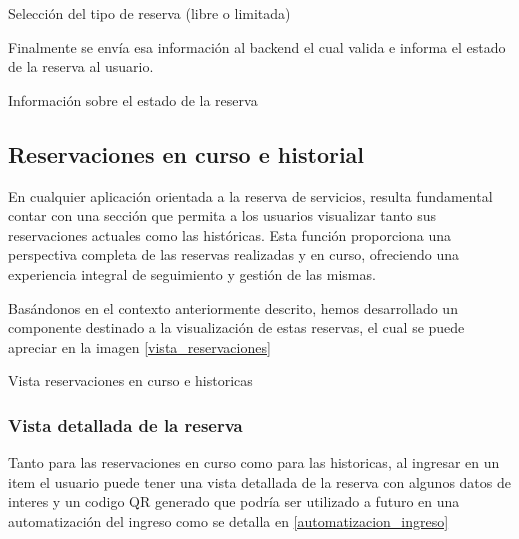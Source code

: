 \begin{images}[\label{reserva_process}]{Selección del tipo de reserva (libre o limitada)}
\end{images}

Finalmente se envía esa información al backend el cual valida e informa el estado de la reserva al usuario.

\begin{images}[\label{reservacion_checkout}]{Información sobre el estado de la reserva}
\end{images}


\subsection{Reservaciones en curso e historial}
En cualquier aplicación orientada a la reserva de servicios, resulta fundamental contar con una sección que permita a los usuarios visualizar tanto sus reservaciones actuales como las históricas. Esta función proporciona una perspectiva completa de las reservas realizadas y en curso, ofreciendo una experiencia integral de seguimiento y gestión de las mismas.

Basándonos en el contexto anteriormente descrito, hemos desarrollado un componente destinado a la visualización de estas reservas, el cual se puede apreciar en la imagen \ref{vista_reservaciones}

\begin{images}[\label{vista_reservaciones}]{Vista reservaciones en curso e historicas}
\end{images}

\subsubsection{Vista detallada de la reserva}
Tanto para las reservaciones en curso como para las historicas, al ingresar en un item el usuario puede tener una vista detallada de la reserva con algunos datos de interes y un codigo QR generado que podría ser utilizado a futuro en una automatización del ingreso como se detalla en \ref{automatizacion_ingreso}

